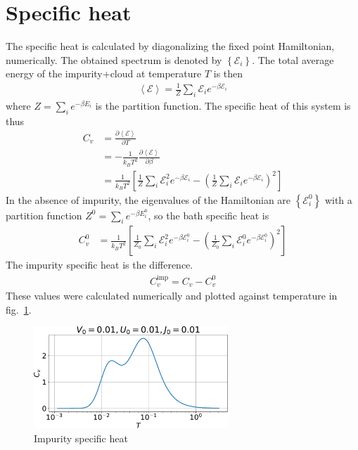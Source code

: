 \documentclass[twoside,11pt]{report}
\numberwithin{equation}{section}
\begin{document}
\section{Specific heat}
The specific heat is calculated by diagonalizing the fixed point Hamiltonian, numerically. The obtained spectrum is denoted by \(\left\{ \mathcal{E}_i \right\} \). The total average energy of the impurity+cloud at temperature \(T\) is then
\begin{equation}\begin{aligned}
	\left<\mathcal{E} \right> = \frac{1}{Z}\sum_{i} \mathcal{E}_i e^{-\beta \mathcal{E}_i}
\end{aligned}\end{equation}
where \(Z = \sum_{i} e^{-\beta E_i}\) is the partition function. The specific heat of this system is thus
\begin{equation}\begin{aligned}
	C_v &= \frac{\partial{\left<\mathcal{E} \right>}}{\partial{T}} \\
	    &= -\frac{1}{k_B T^2} \frac{\partial{\left<\mathcal{E} \right>}}{\partial{\beta}} \\
	    &= \frac{1}{k_B T^2}\left[\frac{1}{Z}\sum_i \mathcal{E}_i^2 e^{-\beta \mathcal{E}_i} - \left(\frac{1}{Z}\sum_i \mathcal{E}_i e^{-\beta \mathcal{E}_i}\right)^2 \right] 
\end{aligned}\end{equation}
In the absence of impurity, the eigenvalues of the Hamiltonian are \(\left\{\mathcal{E}_i^0\right\}\) with a partition function \(Z^0 = \sum_{i} e^{-\beta E_i^0}\), so the bath specific heat is
\begin{equation}\begin{aligned}
	C_v^0 &= \frac{1}{k_B T^2}\left[\frac{1}{Z_0}\sum_i \mathcal{E}_i^2 e^{-\beta \mathcal{E}_i^0} - \left(\frac{1}{Z_0}\sum_i \mathcal{E}_i^0 e^{-\beta \mathcal{E}_i^0}\right)^2 \right] 
\end{aligned}\end{equation}
The impurity specific heat is the difference.
\begin{equation}\begin{aligned}
	C_v^\text{imp} = C_v - C_v^0
\end{aligned}\end{equation}
These values were calculated numerically and plotted against temperature in fig.~\ref{cv}.
\begin{figure}[htpb]
	\centering
	\includegraphics[width=0.65\textwidth]{../figures/Cv_new.pdf}
	\caption{Impurity specific heat}
	\label{cv}
\end{figure}
\end{document}
